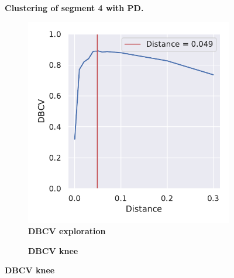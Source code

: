 \begin{figure}[!htb]
\begin{subfigure}[b]{0.475\textwidth}
    \end{subfigure}
    \caption[Clustering of segment 4 with PD]{\textbf{Clustering of segment 4 with PD.} }
    \label{fig:PCA_Cluster_DBCV_4}
\end{figure}

\FloatBarrier
\newpage

\begin{figure}[!htb]
    \centering
    \begin{subfigure}[b]{0.475\textwidth}
        \caption[DBCV exploration]{\textbf{DBCV exploration}}
        \label{subfig:UMAP_Cluster_DBCV_Explo_4}            \includegraphics[width=\textwidth]{UMAP/Cluster_DBCV_Segment_4.pdf}
    \end{subfigure}
    \hfill
    \begin{subfigure}[b]{0.475\textwidth}
        \caption[DBCV knee]{\textbf{DBCV knee}}

\end{subfigure}
\end{figure}
